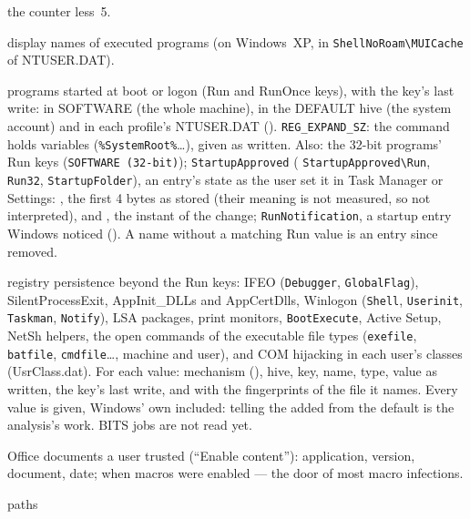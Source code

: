 \documentclass[11pt,a4paper,oneside]{report}
\begin{document}
\begin{description}[style=nextline,leftmargin=1.2em]
        the counter less~5.
  \item[\fichier{muicache.json}] display names of executed programs (on
        Windows~XP, in \texttt{ShellNoRoam\textbackslash MUICache} of
        NTUSER.DAT).
  \item[\fichier{run.json}] programs started at boot or logon (Run and RunOnce
        keys), with the key's last write: in SOFTWARE (the whole machine), in
        the DEFAULT hive (the system account) and in each profile's NTUSER.DAT
        ().  \texttt{REG\_EXPAND\_SZ}: the command
        holds variables (\texttt{\%SystemRoot\%}\ldots), given as written.
        Also: the 32-bit programs' Run keys (\texttt{SOFTWARE (32-bit)});
        \texttt{StartupApproved} (
        \texttt{StartupApproved\textbackslash Run}, \texttt{Run32},
        \texttt{StartupFolder}), an entry's state as the user set it in Task
        Manager or Settings: , the first 4 bytes as stored (their
        meaning is not measured, so not interpreted), and , the
        instant of the change; \texttt{RunNotification}, a startup entry Windows
        noticed (). A name without a matching Run value is
        an entry since removed.
  \item[\fichier{persistence.json}] registry persistence beyond the Run keys:
        IFEO (\texttt{Debugger}, \texttt{GlobalFlag}), SilentProcessExit,
        AppInit\_DLLs and AppCertDlls, Winlogon (\texttt{Shell},
        \texttt{Userinit}, \texttt{Taskman}, \texttt{Notify}), LSA packages,
        print monitors, \texttt{BootExecute}, Active Setup, NetSh helpers, the
        open commands of the executable file types (\texttt{exefile},
        \texttt{batfile}, \texttt{cmdfile}\ldots, machine and user), and COM
        hijacking in each user's classes (UsrClass.dat). For each value:
        mechanism (), hive, key, name, type, value as written,
        the key's last write, and with  the fingerprints of the
        file it names. Every value is given, Windows' own included: telling the
        added from the default is the analysis's work. BITS jobs are not read
        yet.
  \item[\fichier{office\_trust\_records.json}] Office documents a user trusted
        (``Enable content''): application, version, document, date;
         when macros were enabled — the door of most macro
        infections.
  \item[\fichier{typed\_paths.json}, \fichier{word\_wheel\_query.json}] paths

\end{description}
\end{document}
